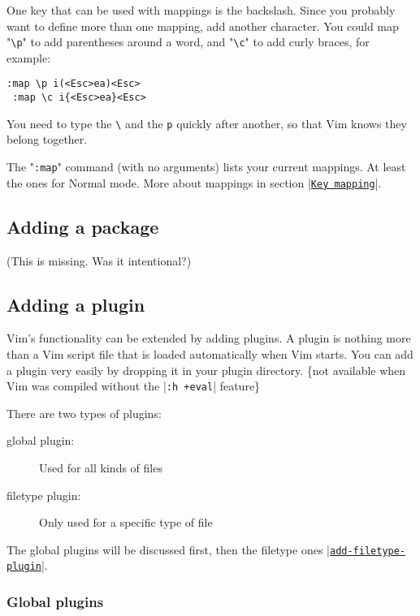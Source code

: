 One key that can be used with mappings is the backslash.
Since you probably want to define more than one mapping, add another character.
You could map "\texttt{\textbackslash{}p}" to add parentheses around a word, and "\texttt{\textbackslash{}c}" to add curly braces, for example:

 \begin{Verbatim}[samepage=true]
 :map \p i(<Esc>ea)<Esc>
 :map \c i{<Esc>ea}<Esc>
 \end{Verbatim}

 You need to type the \texttt{\textbackslash{}} and the \texttt{p} quickly after another, so that Vim knows they belong together.

The "\texttt{:map}" command (with no arguments) lists your current mappings.
At least the ones for Normal mode.
More about mappings in section |\hyperref[Key mapping]{\texttt{Key mapping}}|.

\subsection{Adding a package}
(This is missing.  Was it intentional?)

\subsection{Adding a plugin}
\label{add-plugin}
\label{plugin}

Vim's functionality can be extended by adding plugins.
A plugin is nothing more than a Vim script file that is loaded automatically when Vim starts.
You can add a plugin very easily by dropping it in your plugin directory.
\{not available when Vim was compiled without the |\texttt{:h +eval}| feature\}

There are two types of plugins:
\begin{description}
				\item [global plugin:] Used for all kinds of files
				\item [filetype plugin:] Only used for a specific type of file
\end{description}

The global plugins will be discussed first, then the filetype ones \hyperref[add-filetype-plugin]{|\texttt{add-filetype-plugin}|}.

\subsubsection{Global plugins}
\label{standard-plugin}

